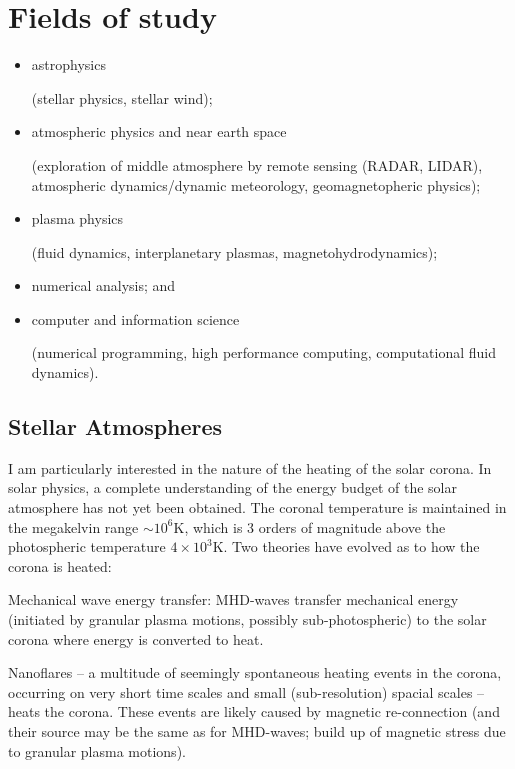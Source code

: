 

\section{Fields of study}

\begin{itemize}
  
\item astrophysics

  (stellar physics, stellar wind);

\item atmospheric physics and near earth space

  (exploration of middle atmosphere by remote sensing (RADAR, LIDAR), atmospheric dynamics/dynamic meteorology, geomagnetopheric physics);

\item plasma physics

  (fluid dynamics, interplanetary plasmas, magnetohydrodynamics);

  \item numerical analysis; and

  \item computer and information science

    (numerical programming, high performance computing, computational fluid dynamics).
  
\end{itemize}

\subsection{Stellar Atmospheres}

I am particularly interested in the nature of the heating of the solar corona. In solar physics, a complete understanding of the energy budget of the solar atmosphere has not yet been obtained. The coronal temperature is maintained in the megakelvin range $\sim 10^6$K, which is 3 orders of magnitude above the photospheric temperature $4\times10^3$K. Two theories have evolved as to how the corona is heated:

Mechanical wave energy transfer: MHD-waves transfer mechanical energy (initiated by granular plasma motions, possibly sub-photospheric) to the solar corona where energy is converted to heat.

Nanoflares -- a multitude of seemingly spontaneous heating events in the corona, occurring on very short time scales and small (sub-resolution) spacial scales -- heats the corona. These events are likely caused by magnetic re-connection (and their source may be the same as for MHD-waves; build up of magnetic stress due to granular plasma motions).

